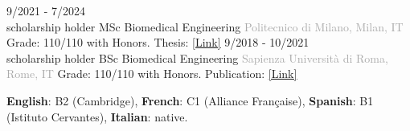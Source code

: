 \documentclass[9pt]{developercv} %
\begin{document}
\vspace{-18 pt}
\begin{entrylist}
    \entry
		{9/2021 - 7/2024 \\\footnotesize{scholarship holder}}
		{MSc Biomedical Engineering}
		{\textcolor{darkgray}{Politecnico di Milano, Milan, IT}}
		{Grade: 110/110 with Honors. Thesis: \textcolor{blue}{\href{https://hdl.handle.net/10589/222510}{\underline{[Link]}}}}
    \entry
		{9/2018 - 10/2021 \\\footnotesize{scholarship holder}}
		{BSc Biomedical Engineering}
		{\textcolor{darkgray}{Sapienza Università di Roma, Rome, IT}}
		{Grade: 110/110 with Honors. Publication: \textcolor{blue}{\href{https://doi.org/10.3389/fnhum.2022.1016862}{\underline{[Link]}}}}
\end{entrylist}

\vspace{-10 pt}
    \vspace{-10pt}
    
    \hspace{26mm} \textbf{English}: B2 (Cambridge), \textbf{French}: C1 (Alliance Française), \textbf{Spanish}: B1 (Istituto Cervantes), \textbf{ Italian}: native.

\end{document}
